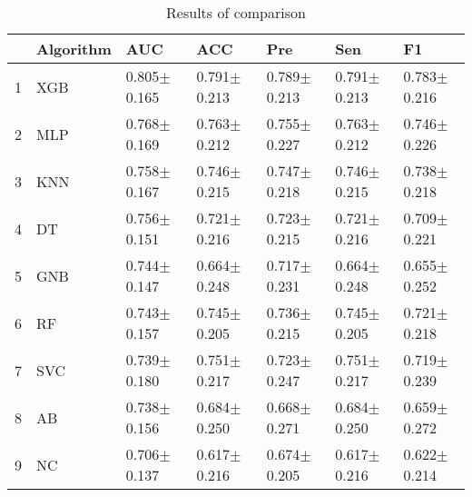 \begin{table}
\footnotesize
\caption{Results of comparison}
\label{tab:comparison}
\begin{tabular}{lllllll}
\hline
 & Algorithm & AUC & ACC & Pre & Sen & F1 \\
\hline
1 & XGB & 0.805$\pm$0.165 & 0.791$\pm$0.213 & 0.789$\pm$0.213 & 0.791$\pm$0.213 & 0.783$\pm$0.216 \\
2 & MLP & 0.768$\pm$0.169 & 0.763$\pm$0.212 & 0.755$\pm$0.227 & 0.763$\pm$0.212 & 0.746$\pm$0.226 \\
3 & KNN & 0.758$\pm$0.167 & 0.746$\pm$0.215 & 0.747$\pm$0.218 & 0.746$\pm$0.215 & 0.738$\pm$0.218 \\
4 & DT & 0.756$\pm$0.151 & 0.721$\pm$0.216 & 0.723$\pm$0.215 & 0.721$\pm$0.216 & 0.709$\pm$0.221 \\
5 & GNB & 0.744$\pm$0.147 & 0.664$\pm$0.248 & 0.717$\pm$0.231 & 0.664$\pm$0.248 & 0.655$\pm$0.252 \\
6 & RF & 0.743$\pm$0.157 & 0.745$\pm$0.205 & 0.736$\pm$0.215 & 0.745$\pm$0.205 & 0.721$\pm$0.218 \\
7 & SVC & 0.739$\pm$0.180 & 0.751$\pm$0.217 & 0.723$\pm$0.247 & 0.751$\pm$0.217 & 0.719$\pm$0.239 \\
8 & AB & 0.738$\pm$0.156 & 0.684$\pm$0.250 & 0.668$\pm$0.271 & 0.684$\pm$0.250 & 0.659$\pm$0.272 \\
9 & NC & 0.706$\pm$0.137 & 0.617$\pm$0.216 & 0.674$\pm$0.205 & 0.617$\pm$0.216 & 0.622$\pm$0.214 \\
\hline
\end{tabular}
\end{table}
